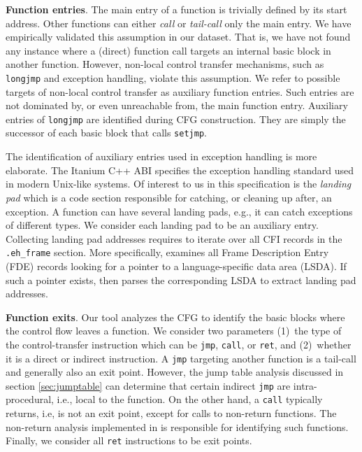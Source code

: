 \textbf{Function entries}.
The main entry of a function is trivially defined by its start address.
Other functions can either \textit{call} or \textit{tail-call} only the main entry.
We have empirically validated this assumption in our dataset.
That is, we have not found any instance where a (direct) function call targets an internal basic block in another function.
However, non-local control transfer mechanisms, such as \texttt{longjmp} and exception handling, violate this assumption.
We refer to possible targets of non-local control transfer as auxiliary function entries.
Such entries are not dominated by, or even unreachable from, the main function entry.
Auxiliary entries of \texttt{longjmp} are identified during CFG construction.
They are simply the successor of each basic block that calls \texttt{setjmp}.

The identification of auxiliary entries used in exception handling is more elaborate.
The Itanium C++ ABI specifies the exception handling standard used in modern Unix-like systems.
Of interest to us in this specification is the \textit{landing pad} which is a code section responsible for catching, or cleaning up after, an exception.
A function can have several landing pads, e.g., it can catch exceptions of different types.
We consider each landing pad to be an auxiliary entry.
Collecting landing pad addresses requires {\bcov} to iterate over all CFI records in the \texttt{.eh\_frame} section.
More specifically, {\bcov} examines all Frame Description Entry (FDE) records looking for a pointer to a language-specific data area (LSDA).
If such a pointer exists, then {\bcov} parses the corresponding LSDA to extract landing pad addresses.

\textbf{Function exits}.
Our tool analyzes the CFG to identify the basic blocks where the control flow leaves a function.
We consider two parameters 
(1)~the type of the control-transfer instruction which can be \texttt{jmp}, \texttt{call}, or \texttt{ret}, and
(2)~whether it is a direct or indirect instruction.
A \texttt{jmp} targeting another function is a tail-call and generally also an exit point.
However, the jump table analysis discussed in section \ref{sec:jumptable} can determine that certain indirect \texttt{jmp} are intra-procedural, i.e., local to the function.
On the other hand,  a \texttt{call} typically returns, i.e, is not an exit point, except for calls to non-return functions.
The non-return analysis implemented in {\bcov} is responsible for identifying such functions.
Finally, we consider all \texttt{ret} instructions to be exit points.

